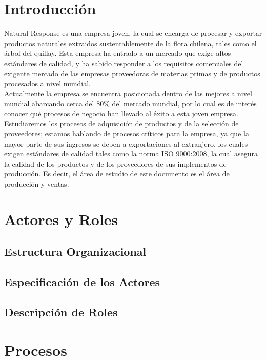 \documentclass[12pt,letterpaper]{article}
\begin{document}
\section{Introducción}
Natural Response es una empresa joven, la cual se encarga de procesar y exportar productos naturales extraidos sustentablemente de la flora chilena, tales como el árbol del quillay. Esta empresa ha entrado a un mercado que exige altos estándares de calidad, y ha sabido responder a los requisitos comerciales del exigente mercado de las empresas proveedoras de materias primas y de productos procesados a nivel mundial.\\
Actualmente la empresa se encuentra posicionada dentro de las mejores a nivel mundial abarcando cerca del 80\% del mercado mundial, por lo cual es de interés conocer qué procesos de negocio han llevado al éxito a esta joven empresa. Estudiaremos los procesos de adquisición de productos y de la selección de proveedores; estamos hablando de procesos críticos para la empresa, ya que la mayor parte de sus ingresos se deben a exportaciones al extranjero, los cuales exigen estándares de calidad tales como la norma ISO 9000:2008, la cual asegura la calidad de los productos y de los proveedores de sus implementos de producción. Es decir, el área de estudio de este documento es el área de producción y ventas.\\



\section{Actores y Roles}

\subsection{Estructura Organizacional}



\subsection{Especificación de los Actores}

\subsection{Descripción de Roles}

\section{Procesos}
\end{document}
